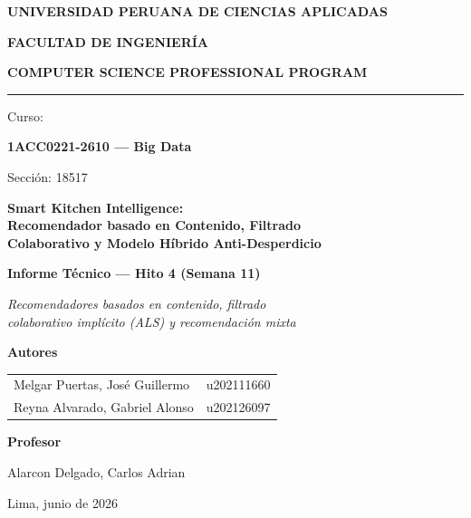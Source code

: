 \documentclass[12pt,a4paper]{article}
\begin{document}
\begin{titlepage}
\centering
\vspace*{0.5cm}
{\LARGE\bfseries UNIVERSIDAD PERUANA DE CIENCIAS APLICADAS\par}
\vspace{0.3cm}
{\Large\bfseries FACULTAD DE INGENIERÍA\par}
\vspace{0.2cm}
{\large\bfseries COMPUTER SCIENCE PROFESSIONAL PROGRAM\par}

\vspace{1.2cm}
{\color{upcred}\rule{6cm}{3pt}}\par
\vspace{0.8cm}

{\large Curso:\par}
{\Large\bfseries 1ACC0221-2610 — Big Data\par}
{\large Sección: 18517\par}

\vspace{1.5cm}
\begin{minipage}{0.85\textwidth}
\centering
{\Large\bfseries Smart Kitchen Intelligence: \\[0.3em]
Recomendador basado en Contenido, Filtrado\\[0.3em]
Colaborativo y Modelo Híbrido Anti-Desperdicio\par}
\end{minipage}

\vspace{1.5cm}
{\large\bfseries Informe Técnico — Hito 4 (Semana 11)\par}
{\large\itshape Recomendadores basados en contenido, filtrado\\
colaborativo implícito (ALS) y recomendación mixta\par}

\vspace{1.8cm}
{\large\bfseries Autores\par}
\vspace{0.4cm}
\begin{tabular}{ll}
Melgar Puertas, José Guillermo & u202111660 \\[4pt]
Reyna Alvarado, Gabriel Alonso & u202126097 \\
\end{tabular}

\vspace{1.2cm}
{\large\bfseries Profesor\par}
\vspace{0.3cm}
{\large Alarcon Delgado, Carlos Adrian\par}

\vfill
{\large Lima, junio de 2026\par}
\end{titlepage}
\end{document}
